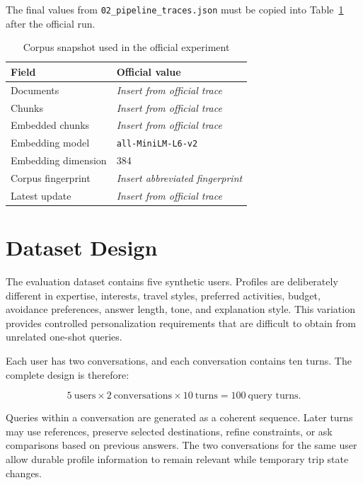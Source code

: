 The final values from \texttt{02\_pipeline\_traces.json} must be copied into
Table~\ref{tab:corpus-snapshot} after the official run.

\begin{table}[H]
\centering
\caption{Corpus snapshot used in the official experiment}
\label{tab:corpus-snapshot}
\begin{tabular}{ll}
\hline
\textbf{Field} & \textbf{Official value} \\
\hline
Documents & \textit{Insert from official trace} \\
Chunks & \textit{Insert from official trace} \\
Embedded chunks & \textit{Insert from official trace} \\
Embedding model & \texttt{all-MiniLM-L6-v2} \\
Embedding dimension & 384 \\
Corpus fingerprint & \textit{Insert abbreviated fingerprint} \\
Latest update & \textit{Insert from official trace} \\
\hline
\end{tabular}
\end{table}

\section{Dataset Design}

The evaluation dataset contains five synthetic users. Profiles are deliberately
different in expertise, interests, travel styles, preferred activities, budget,
avoidance preferences, answer length, tone, and explanation style. This
variation provides controlled personalization requirements that are difficult
to obtain from unrelated one-shot queries.

Each user has two conversations, and each conversation contains ten turns. The
complete design is therefore:

\begin{equation}
5\ \text{users} \times 2\ \text{conversations} \times
10\ \text{turns} = 100\ \text{query turns}.
\end{equation}

Queries within a conversation are generated as a coherent sequence. Later
turns may use references, preserve selected destinations, refine constraints,
or ask comparisons based on previous answers. The two conversations for the
same user allow durable profile information to remain relevant while temporary
trip state changes.

